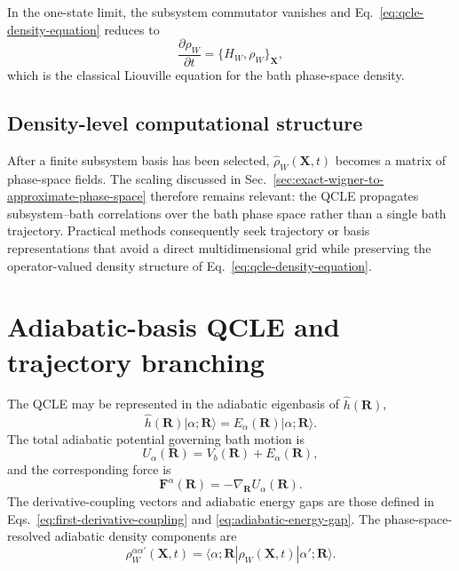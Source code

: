 \documentclass[
  11pt,
  letterpaper,
  onehalfspacing,
  normalmargins,
  equalmargins,
  oneside
]{ut-thesis}
\begin{document}
In the one-state limit, the subsystem commutator vanishes and
Eq.~\eqref{eq:qcle-density-equation} reduces to
\begin{equation}
\frac{\partial\rho_W}{\partial t}
=
\{H_W,\rho_W\}_{\mathbf X},
\label{eq:qcle-classical-poisson-limit}
\end{equation}
which is the classical Liouville equation for the bath phase-space density.


\subsection{Density-level computational structure}
\label{subsec:qcle-grid-problem}

After a finite subsystem basis has been selected,
\(\hat\rho_W(\mathbf X,t)\) becomes a matrix of phase-space fields. The
scaling discussed in Sec.~\ref{sec:exact-wigner-to-approximate-phase-space}
therefore remains relevant: the QCLE propagates subsystem--bath correlations
over the bath phase space rather than a single bath trajectory. Practical
methods consequently seek trajectory or basis representations that avoid a
direct multidimensional grid while preserving the operator-valued density
structure of Eq.~\eqref{eq:qcle-density-equation}.


\section{Adiabatic-basis QCLE and trajectory branching}
\label{sec:adiabatic-qcle-branching}

The QCLE may be represented in the adiabatic eigenbasis of
\(\hat h(\mathbf R)\),
\begin{equation}
\hat h(\mathbf R)
|\alpha;\mathbf R\rangle
=
E_\alpha(\mathbf R)
|\alpha;\mathbf R\rangle.
\label{eq:adiabatic-qcle-eigenproblem}
\end{equation}
The total adiabatic potential governing bath motion is
\begin{equation}
U_\alpha(\mathbf R)
=
V_b(\mathbf R)
+
E_\alpha(\mathbf R),
\label{eq:adiabatic-potential-energy-surface}
\end{equation}
and the corresponding force is
\begin{equation}
\mathbf F^\alpha(\mathbf R)
=
-
\nabla_{\mathbf R}U_\alpha(\mathbf R).
\label{eq:adiabatic-force}
\end{equation}
The derivative-coupling vectors and adiabatic energy gaps are those defined in
Eqs.~\eqref{eq:first-derivative-coupling} and
\eqref{eq:adiabatic-energy-gap}. The phase-space-resolved adiabatic density
components are
\begin{equation}
\rho_W^{\alpha\alpha'}(\mathbf X,t)
=
\langle\alpha;\mathbf R|
\hat\rho_W(\mathbf X,t)
|\alpha';\mathbf R\rangle.
\label{eq:adiabatic-density-matrix-elements}
\end{equation}
\end{document}
